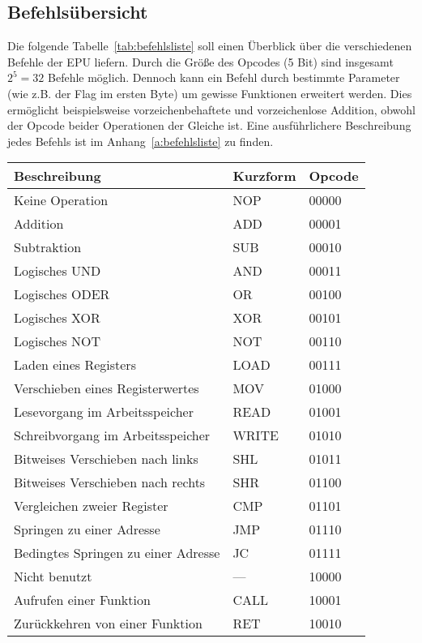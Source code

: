 \subsection{Befehlsübersicht}
Die folgende Tabelle~\ref{tab:befehlsliste} soll einen Überblick über die
verschiedenen Befehle der \ac{EPU} liefern. Durch die Größe des Opcodes (5 Bit)
sind insgesamt $2^5 = 32$ Befehle möglich. Dennoch kann ein Befehl durch
bestimmte Parameter (wie z.B. der Flag im ersten Byte) um gewisse Funktionen
erweitert werden. Dies ermöglicht beispielsweise vorzeichenbehaftete und
vorzeichenlose Addition, obwohl der Opcode beider Operationen der Gleiche ist.
Eine ausführlichere Beschreibung jedes Befehls ist im
Anhang~\ref{a:befehlsliste} zu finden.
\begin{table}[htb]
\centering
\begin{tabular}{lll}
\toprule
Beschreibung									& Kurzform	& Opcode\\
\midrule
Keine Operation									& NOP		& 00000\\
Addition										& ADD   	& 00001\\
Subtraktion										& SUB   	& 00010\\
Logisches UND									& AND   	& 00011\\
Logisches ODER									& OR    	& 00100\\
Logisches XOR									& XOR   	& 00101\\
Logisches NOT									& NOT   	& 00110\\
Laden eines Registers							& LOAD  	& 00111\\
Verschieben eines Registerwertes				& MOV   	& 01000\\
Lesevorgang im Arbeitsspeicher					& READ  	& 01001\\
Schreibvorgang im Arbeitsspeicher				& WRITE 	& 01010\\
Bitweises Verschieben nach links				& SHL   	& 01011\\
Bitweises Verschieben nach rechts				& SHR   	& 01100\\
Vergleichen zweier Register						& CMP   	& 01101\\
Springen zu einer Adresse						& JMP   	& 01110\\
Bedingtes Springen zu einer Adresse				& JC    	& 01111\\
Nicht benutzt									& ---   	& 10000\\
Aufrufen einer Funktion							& CALL  	& 10001\\
Zurückkehren von einer Funktion					& RET   	& 10010\\

\end{tabular}
\end{table}
